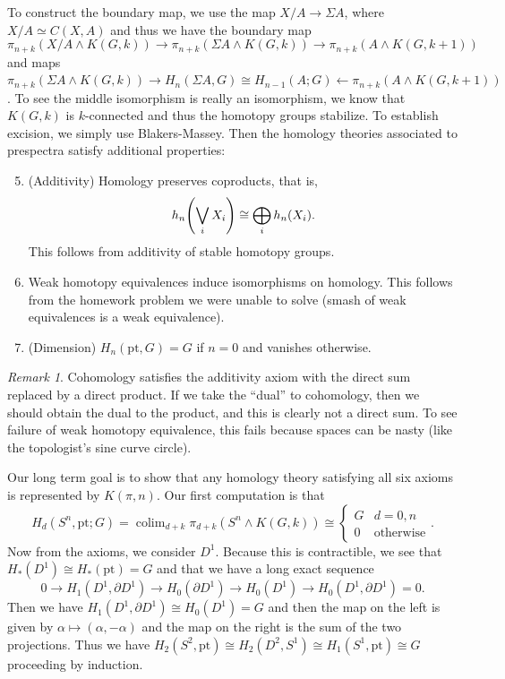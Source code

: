 \documentclass[leqno, openany]{memoir}
\theoremstyle{definition}
\theoremstyle{remark}
\newtheorem{rmk}[thm]{Remark}
\theoremstyle{plain}
\theoremstyle{definition}
\theoremstyle{remark}
\newcommand{\mr}[1]{\mathrm{#1}}
\DeclareMathOperator{\colim}{colim}
\begin{document}
To construct the boundary map, we use the map $X/A \to \Sigma A$, where $X/A \simeq C(X,A)$ and thus we have the boundary map
\[ \pi_{n+k}(X/A \wedge K(G, k)) \to \pi_{n+k}(\Sigma A \wedge K(G, k)) \to \pi_{n+k}(A \wedge K(G, k+1)) \]
and maps $\pi_{n+k}(\Sigma A \wedge K(G, k)) \to H_n(\Sigma A, G) \cong H_{n-1}(A;G) \gets \pi_{n+k}(A \wedge K(G, k+1))$.
To see the middle isomorphism is really an isomorphism, we know that $K(G, k)$ is $k$-connected and thus the homotopy groups stabilize. To establish excision, we simply use Blakers-Massey. Then the homology theories associated to prespectra satisfy additional properties:
\begin{enumerate}
    \setcounter{enumi}{4}
    \item (Additivity) Homology preserves coproducts, that is, 
        \[ h_n\qty(\bigvee_i X_i) \cong \bigoplus_i h_n(X_i). \]
        This follows from additivity of stable homotopy groups.
    \item Weak homotopy equivalences induce isomorphisms on homology. This follows from the homework problem we were unable to solve (smash of weak equivalences is a weak equivalence).
    \item (Dimension) $H_n(\mr{pt}, G) = G$ if $n=0$ and vanishes otherwise.
\end{enumerate}

\begin{rmk}
    Cohomology satisfies the additivity axiom with the direct sum replaced by a direct product. If we take the ``dual'' to cohomology, then we should obtain the dual to the product, and this is clearly not a direct sum. To see failure of weak homotopy equivalence, this fails because spaces can be nasty (like the topologist's sine curve circle).
\end{rmk}

Our long term goal is to show that any homology theory satisfying all six axioms is represented by $K(\pi, n)$. Our first computation is that 
\[ H_d(S^n, \mr{pt}; G) = \colim_{d+k} \pi_{d+k}(S^n \wedge K(G, k)) \cong \begin{cases}
    G & d = 0,n \\
    0 & \text{otherwise}
\end{cases}. \]
Now from the axioms, we consider $D^1$. Because this is contractible, we see that $H_*(D^1) \cong H_*(\mr{pt}) = G$ and that we have a long exact sequence
\[ 0 \to H_1(D^1, \partial D^1) \to H_0(\partial D^1) \to H_0(D^1) \to H_0(D^1, \partial D^1) = 0. \]
Then we have $H_1(D^1, \partial D^1) \cong H_0(D^1) = G$ and then the map on the left is given by $\alpha \mapsto (\alpha, -\alpha)$ and the map on the right is the sum of the two projections. Thus we have $H_2(S^2, \mr{pt}) \cong H_2(D^2, S^1) \cong H_1(S^1, \mr{pt}) \cong G$ proceeding by induction. 
\end{document}
